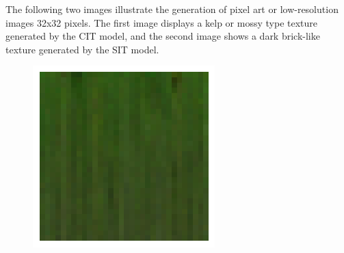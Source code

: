 \begin{itemize}
            The following two images illustrate the generation of pixel art or low-resolution images 32x32 pixels. The first image displays a kelp or mossy type texture generated by the CIT model, and the second image shows a dark brick-like texture generated by the SIT model.
    
            \begin{figure}[H]
                \centering
                \begin{minipage}{0.30\textwidth}
                    \centering
                    \includegraphics[width=\textwidth]{imgs/GenExample2.png} 
                    \label{fig:GenExample2}
                \end{minipage}
                \hspace{0.05\textwidth} %
                \begin{minipage}{0.30\textwidth}
                    \centering

\end{minipage}
\end{figure}
\end{itemize}
